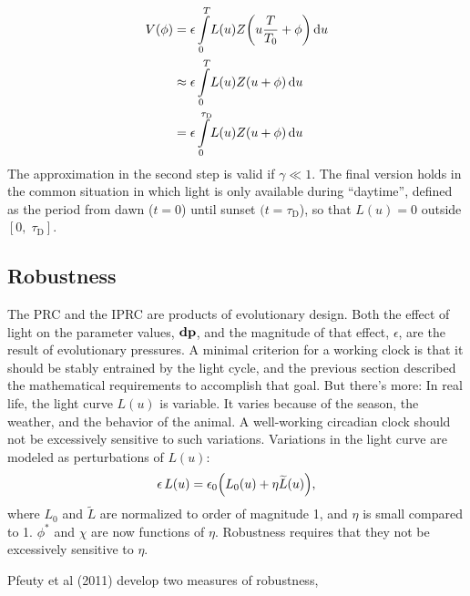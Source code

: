 \begin{equation}\label{eq:convolution}
\begin{aligned}
V(\phi)&=\epsilon \int_{0}^{T}\! 
L(u)Z\qty(u\frac{T}{{T}_{0}}+\phi) \id{u}
\\
&\approx\epsilon \int_{0}^{T}\!
L(u)Z(u+\phi)\id{u}
\\
&=\epsilon \int _{0}^{\tau_\text{D}}\!
L(u)Z(u+\phi)\id{u}
\end{aligned}
\end{equation}
The approximation in the second step is valid if  $\gamma\ll1$. The
final version holds in the common situation in which light is only
available during ``daytime'', defined as the period from dawn ($t=0$)
until sunset  $(t=\tau_\text{D}$), so that  $L(u)=0$ outside
 $[0,\;\tau_\text{D}]$. 





\subsection{Robustness}
The PRC and the IPRC are products of evolutionary design. Both the
effect of light on the parameter values,  $\vb{dp}$, and the
magnitude of that effect,  $\epsilon $, are the result of
evolutionary pressures. A minimal criterion for a working clock is
that it should be stably entrained by the light cycle, and the
previous section described the mathematical requirements to
accomplish that goal. But there's more: In real life, the light curve
 $L(u)$ is variable. It varies because of the season, the weather,
and the behavior of the animal. A well-working circadian clock should
not be excessively sensitive to such variations. Variations in the
light curve are modeled as perturbations of  $L(u)$:
\begin{equation}
\epsilon\,L(u)
=\epsilon_{0}\qty({L}_{0}(u)+\eta \widetilde{{L}}(u)),
\end{equation}
where ${L}_{0}$ and  $\widetilde{{L}}$ are normalized to order of magnitude
1, and  $\eta$ is small compared to 1. $\phi^{*}$ and $\chi$ are now
functions of $\eta$. Robustness requires that they not be excessively
sensitive to  $\eta$.

Pfeuty et al (2011) develop two measures of robustness,

